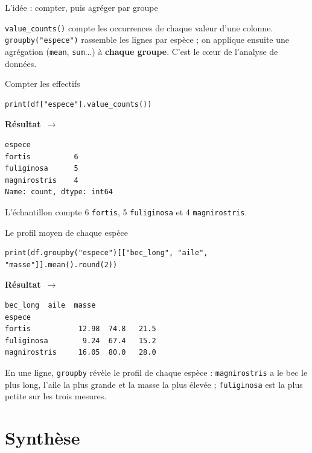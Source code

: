 \documentclass[aspectratio=169,11pt]{beamer}
\newcommand{\resultat}{{\scriptsize\textbf{R\'esultat}~$\rightarrow$}\par\vspace{1pt}}
\begin{document}
\begin{frame}{L'idée : compter, puis agréger par groupe}
\begin{ucaddef}
{\small \texttt{value\_counts()} compte les occurrences de chaque valeur d'une colonne. \texttt{groupby("espece")} rassemble les lignes par espèce ; on applique ensuite une agrégation (\texttt{mean}, \texttt{sum}...) à \textbf{chaque groupe}. C'est le cœur de l'analyse de données.}
\end{ucaddef}
\end{frame}

\begin{frame}[fragile]{Compter les effectifs}
\begin{lstlisting}
print(df["espece"].value_counts())
\end{lstlisting}
\resultat
\begin{lstlisting}[style=out]
espece
fortis          6
fuliginosa      5
magnirostris    4
Name: count, dtype: int64
\end{lstlisting}
{\small L'échantillon compte 6 \texttt{fortis}, 5 \texttt{fuliginosa} et 4 \texttt{magnirostris}.}
\end{frame}

\begin{frame}[fragile]{Le profil moyen de chaque espèce}
\begin{lstlisting}
print(df.groupby("espece")[["bec_long", "aile", "masse"]].mean().round(2))
\end{lstlisting}
\resultat
\begin{lstlisting}[style=out]
              bec_long  aile  masse
espece
fortis           12.98  74.8   21.5
fuliginosa        9.24  67.4   15.2
magnirostris     16.05  80.0   28.0
\end{lstlisting}
{\small En une ligne, \texttt{groupby} révèle le profil de chaque espèce : \texttt{magnirostris} a le bec le plus long, l'aile la plus grande et la masse la plus élevée ; \texttt{fuliginosa} est la plus petite sur les trois mesures.}
\end{frame}

\section{Synthèse}
\end{document}
